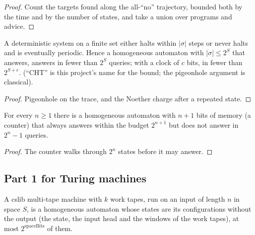 \begin{proof}
  \leanok
  Count the targets found along the all-``no'' trajectory, bounded both by the time and by the
  number of states, and take a union over programs and advice.
\end{proof}

\begin{theorem}
  \label{thm:cht}
  \leanok
  A deterministic system on a finite set either halts within $|\sigma|$ steps or never halts and is
  eventually periodic. Hence a homogeneous automaton with $|\sigma| \le 2^S$ that answers, answers
  in fewer than $2^S$ queries; with a clock of $c$ bits, in fewer than $2^{S+c}$.
  \own{} (``CHT'' is this project's name for the bound; the pigeonhole argument is classical).
\end{theorem}

\begin{proof}
  \leanok
  Pigeonhole on the trace, and the Noether charge after a repeated state.
\end{proof}

\begin{theorem}
  \label{thm:cht-exponential}
  \leanok
  For every $n \ge 1$ there is a homogeneous automaton with $n+1$ bits of memory (a counter) that
  always answers within the budget $2^{n+1}$ but does not answer in $2^n - 1$ queries.
  \own{}
\end{theorem}

\begin{proof}
  \leanok
  The counter walks through $2^n$ states before it may answer.
\end{proof}

\subsection{Part 1 for Turing machines}

\begin{definition}
  \label{def:toAutomaton}
  \leanok
  A cslib multi-tape machine with $k$ work tapes, run on an input of length $n$ in space $S$, is a
  homogeneous automaton whose states are its configurations without the output (the state, the
  input head and the windows of the work tapes), at most $2^{\mathrm{spaceBits}}$ of them.
  \own{}
\end{definition}

